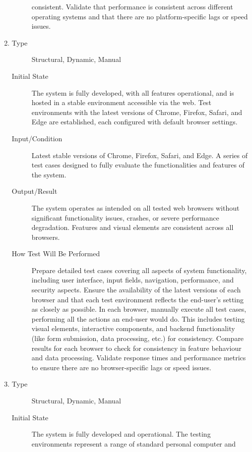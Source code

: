 \documentclass[12pt, titlepage]{article}
\begin{document}
\begin{enumerate}[NFR-T1]
\begin{description}
    consistent. Validate that performance is consistent across different
    operating systems and that there are no platform-specific lags or speed
    issues.
  \end{description}
\item \label{NFRT17}
  \begin{description}
  \item[Type] Structural, Dynamic, Manual
  \item[Initial State] The system is fully developed, with all features
    operational, and is hosted in a stable environment accessible via the web.
    Test environments with the latest versions of Chrome, Firefox, Safari, and
    Edge are established, each configured with default browser settings.
  \item[Input/Condition] Latest stable versions of Chrome, Firefox, Safari, and
    Edge. A series of test cases designed to fully evaluate the functionalities
    and features of the system.
  \item[Output/Result] The system operates as intended on all tested web
    browsers without significant functionality issues, crashes, or severe
    performance degradation. Features and visual elements are consistent across
    all browsers.
  \item[How Test Will Be Performed] Prepare detailed test cases covering all
    aspects of system functionality, including user interface, input fields,
    navigation, performance, and security aspects. Ensure the availability of
    the latest versions of each browser and that each test environment reflects
    the end-user's setting as closely as possible. In each browser, manually
    execute all test cases, performing all the actions an end-user would do.
    This includes testing visual elements, interactive components, and backend
    functionality (like form submission, data processing, etc.) for consistency.
    Compare results for each browser to check for consistency in feature
    behaviour and data processing. Validate response times and performance
    metrics to ensure there are no browser-specific lags or speed issues.
  \end{description}
\item \label{NFRT18}
  \begin{description}
  \item[Type] Structural, Dynamic, Manual
  \item[Initial State] The system is fully developed and operational. The
    testing environments represent a range of standard personal computer and

\end{description}
\end{enumerate}
\end{document}
